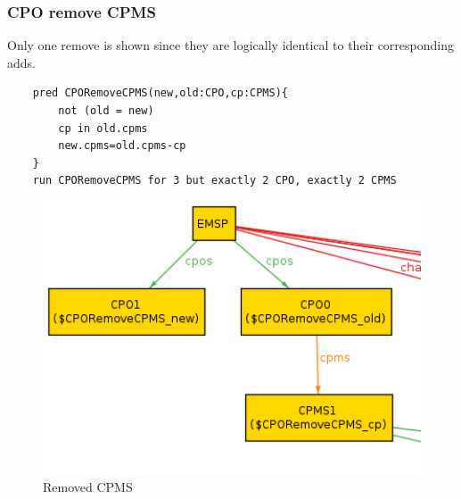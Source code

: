 \subsubsection{CPO remove CPMS}
Only one remove is shown since they are logically identical to their corresponding adds.
\begin{verbatim}
    pred CPORemoveCPMS(new,old:CPO,cp:CPMS){
        not (old = new)
        cp in old.cpms
        new.cpms=old.cpms-cp
    }
    run CPORemoveCPMS for 3 but exactly 2 CPO, exactly 2 CPMS
\end{verbatim}
\begin{figure}[H]
    \includegraphics[keepaspectratio, width=16cm]{Alloy/remove.png}
    \caption{Removed CPMS}
\end{figure}




